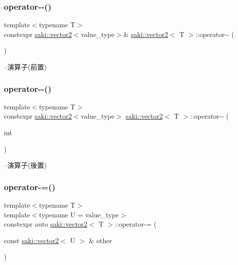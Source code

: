 \subsubsection{\texorpdfstring{operator-\/-\/()}{operator--()}\hspace{0.1cm}{\footnotesize\ttfamily [1/2]}}
{\footnotesize\ttfamily template$<$typename T$>$ \\
constexpr \mbox{\hyperlink{classsaki_1_1vector2}{saki\+::vector2}}$<$value\+\_\+type$>$\& \mbox{\hyperlink{classsaki_1_1vector2}{saki\+::vector2}}$<$ T $>$\+::operator-\/-\/ (\begin{DoxyParamCaption}{ }\end{DoxyParamCaption})\hspace{0.3cm}{\ttfamily [inline]}}



--演算子(前置) 

\mbox{\label{classsaki_1_1vector2_a22794cee08c50d6114ad4407c81b3d30}} 
\subsubsection{\texorpdfstring{operator-\/-\/()}{operator--()}\hspace{0.1cm}{\footnotesize\ttfamily [2/2]}}
{\footnotesize\ttfamily template$<$typename T$>$ \\
constexpr \mbox{\hyperlink{classsaki_1_1vector2}{saki\+::vector2}}$<$value\+\_\+type$>$ \mbox{\hyperlink{classsaki_1_1vector2}{saki\+::vector2}}$<$ T $>$\+::operator-\/-\/ (\begin{DoxyParamCaption}\item[{int}]{ }\end{DoxyParamCaption})\hspace{0.3cm}{\ttfamily [inline]}}



--演算子(後置) 

\mbox{\label{classsaki_1_1vector2_a7812bbe241d7b5871f35da490fea19b4}} 
\subsubsection{\texorpdfstring{operator-\/=()}{operator-=()}}
{\footnotesize\ttfamily template$<$typename T$>$ \\
template$<$typename U  = value\+\_\+type$>$ \\
constexpr auto \mbox{\hyperlink{classsaki_1_1vector2}{saki\+::vector2}}$<$ T $>$\+::operator-\/= (\begin{DoxyParamCaption}\item[{const \mbox{\hyperlink{classsaki_1_1vector2}{saki\+::vector2}}$<$ U $>$ \&}]{other }\end{DoxyParamCaption})\hspace{0.3cm}{\ttfamily [inline]}}



